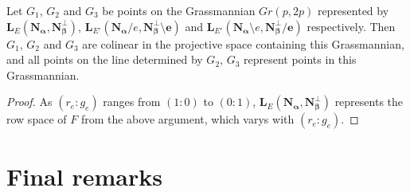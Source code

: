 \documentclass[Unicode]{cedram-alco}
\newcommand{\ext}[1]{\ensuremath{\mathbf{#1}}}
\begin{document}
\begin{prop}
Let $G_1$, $G_2$ and $G_3$ be points on the Grassmannian $Gr(p,2p)$ represented by
$\ext{L}_E(\ext{N_\alpha},\ext{N_\beta^\perp})$,
$\ext{L}_{E'}(\ext{N_\alpha}/e,\ext{N_\beta^\perp\setminus e})$ and
$\ext{L}_{E'}(\ext{N_\alpha}\setminus e,\ext{N_\beta^\perp/e})$ respectively. Then
$G_1$, $G_2$ and $G_3$ are colinear in the projective space containing this Grassmannian, and
all points on the line determined by $G_2$, $G_3$ represent points in this Grassmannian.
\end{prop}
\begin{proof}
  As $(r_e:g_e)$ ranges from $(1:0)$ to $(0:1)$, $\ext{L}_E(\ext{N_\alpha},\ext{N_\beta^\perp})$ represents
  the row space of $F$ from the above argument, which varys with $(r_e:g_e)$.
\end{proof}




\section{Final remarks}





\end{document}
